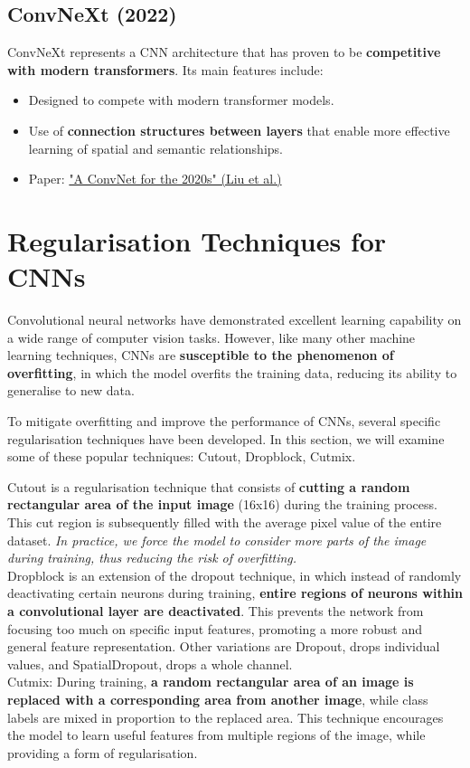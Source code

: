 \subsection{ConvNeXt (2022)}
ConvNeXt represents a CNN architecture that has proven to be \textbf{competitive with modern transformers}. Its main features include:
\begin{itemize}
    \item Designed to compete with modern transformer models.
    \item Use of \textbf{connection structures between layers} that enable more effective learning of spatial and semantic relationships.
    \item Paper: \href{https://arxiv.org/pdf/2201.03545.pdf}{"A ConvNet for the 2020s" (Liu et al.)}
\end{itemize}


\section{Regularisation Techniques for CNNs}
Convolutional neural networks have demonstrated excellent learning capability on a wide range of computer vision tasks. However, like many other machine learning techniques, CNNs are \textbf{susceptible to the phenomenon of overfitting}, in which the model overfits the training data, reducing its ability to generalise to new data.

To mitigate overfitting and improve the performance of CNNs, several specific regularisation techniques have been developed. In this section, we will examine some of these popular techniques: Cutout, Dropblock, Cutmix.

\begin{outline}
Cutout is a regularisation technique that consists of \textbf{cutting a random rectangular area of the input image} (16x16) during the training process. This cut region is subsequently filled with the average pixel value of the entire dataset. \textit{In practice, we force the model to consider more parts of the image during training, thus reducing the risk of overfitting.} \\

Dropblock is an extension of the dropout technique, in which instead of randomly deactivating certain neurons during training, \textbf{entire regions of neurons within a convolutional layer are deactivated}. This prevents the network from focusing too much on specific input features, promoting a more robust and general feature representation. Other variations are Dropout, drops individual values, and SpatialDropout, drops a whole channel.\\

Cutmix: During training, \textbf{a random rectangular area of an image is replaced with a corresponding area from another image}, while class labels are mixed in proportion to the replaced area. This technique encourages the model to learn useful features from multiple regions of the image, while providing a form of regularisation.
\end{outline}


